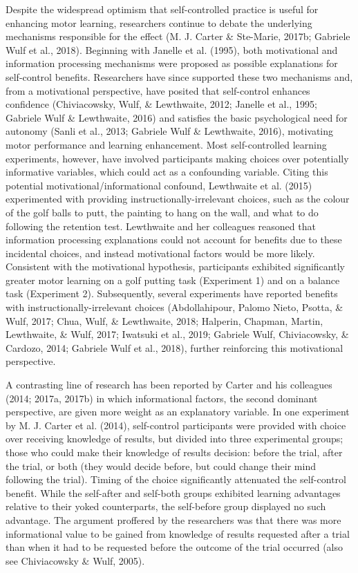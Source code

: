 \documentclass[
  english,
  man,floatsintext]{apa7}
\begin{document}
Despite the widespread optimism that self-controlled practice is useful for enhancing motor learning, researchers continue to debate the underlying mechanisms responsible for the effect (M. J. Carter \& Ste-Marie, 2017b; Gabriele Wulf et al., 2018). Beginning with Janelle et al. (1995), both motivational and information processing mechanisms were proposed as possible explanations for self-control benefits. Researchers have since supported these two mechanisms and, from a motivational perspective, have posited that self-control enhances confidence (Chiviacowsky, Wulf, \& Lewthwaite, 2012; Janelle et al., 1995; Gabriele Wulf \& Lewthwaite, 2016) and satisfies the basic psychological need for autonomy (Sanli et al., 2013; Gabriele Wulf \& Lewthwaite, 2016), motivating motor performance and learning enhancement. Most self-controlled learning experiments, however, have involved participants making choices over potentially informative variables, which could act as a confounding variable. Citing this potential motivational/informational confound, Lewthwaite et al. (2015) experimented with providing instructionally-irrelevant choices, such as the colour of the golf balls to putt, the painting to hang on the wall, and what to do following the retention test. Lewthwaite and her colleagues reasoned that information processing explanations could not account for benefits due to these incidental choices, and instead motivational factors would be more likely. Consistent with the motivational hypothesis, participants exhibited significantly greater motor learning on a golf putting task (Experiment 1) and on a balance task (Experiment 2). Subsequently, several experiments have reported benefits with instructionally-irrelevant choices (Abdollahipour, Palomo Nieto, Psotta, \& Wulf, 2017; Chua, Wulf, \& Lewthwaite, 2018; Halperin, Chapman, Martin, Lewthwaite, \& Wulf, 2017; Iwatsuki et al., 2019; Gabriele Wulf, Chiviacowsky, \& Cardozo, 2014; Gabriele Wulf et al., 2018), further reinforcing this motivational perspective.

A contrasting line of research has been reported by Carter and his colleagues (2014; 2017a, 2017b) in which informational factors, the second dominant perspective, are given more weight as an explanatory variable. In one experiment by M. J. Carter et al. (2014), self-control participants were provided with choice over receiving knowledge of results, but divided into three experimental groups; those who could make their knowledge of results decision: before the trial, after the trial, or both (they would decide before, but could change their mind following the trial). Timing of the choice significantly attenuated the self-control benefit. While the self-after and self-both groups exhibited learning advantages relative to their yoked counterparts, the self-before group displayed no such advantage. The argument proffered by the researchers was that there was more informational value to be gained from knowledge of results requested after a trial than when it had to be requested before the outcome of the trial occurred (also see Chiviacowsky \& Wulf, 2005).
\end{document}
